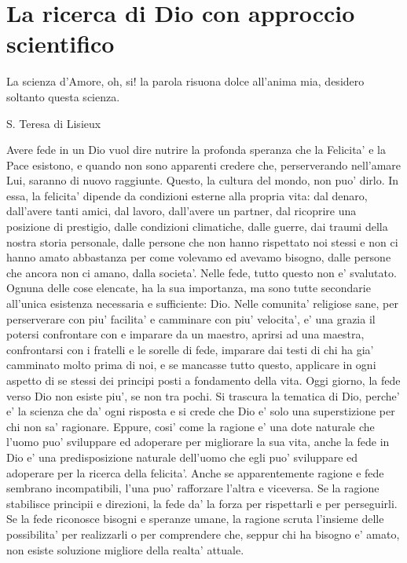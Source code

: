 \chapter{La ricerca di Dio con approccio scientifico}
\label{chapterDio}

\epigraph{
     La scienza d'Amore, oh, si! la parola risuona dolce all'anima mia, desidero soltanto questa scienza.
 }{S. Teresa di Lisieux}

Avere fede in un Dio vuol dire nutrire la profonda speranza che la Felicita' e la Pace esistono, e quando non sono apparenti credere che, perserverando nell'amare Lui, saranno di nuovo raggiunte. Questo, la cultura del mondo, non puo' dirlo. In essa, la felicita' dipende da condizioni esterne alla propria vita: dal denaro, dall'avere tanti amici, dal lavoro, dall'avere un partner, dal ricoprire una posizione di prestigio, dalle condizioni climatiche, dalle guerre, dai traumi della nostra storia personale, dalle persone che non hanno rispettato noi stessi e non ci hanno amato abbastanza per come volevamo ed avevamo bisogno, dalle persone che ancora non ci amano, dalla societa'. Nelle fede, tutto questo non e' svalutato. Ognuna delle cose elencate, ha la sua importanza, ma sono tutte secondarie all'unica esistenza necessaria e sufficiente: Dio.
Nelle comunita' religiose sane, per perserverare con piu' facilita' e camminare con piu' velocita', e' una grazia il potersi confrontare con e imparare da un maestro, aprirsi ad una maestra, confrontarsi con i fratelli e le sorelle di fede, imparare dai testi di chi ha gia' camminato molto prima di noi, e se mancasse tutto questo, applicare in ogni aspetto di se stessi dei principi posti a fondamento della vita.
Oggi giorno, la fede verso Dio non esiste piu', se non tra pochi. Si trascura la tematica di Dio, perche' e' la scienza che da' ogni risposta e si crede che Dio e' solo una superstizione per chi non sa' ragionare. Eppure, cosi' come la ragione e' una dote naturale che l'uomo puo' sviluppare ed adoperare per migliorare la sua vita, anche la fede in Dio e' una predisposizione naturale dell'uomo che egli puo' sviluppare ed adoperare per la ricerca della felicita'. Anche se apparentemente ragione e fede sembrano incompatibili, l'una puo' rafforzare l'altra e viceversa. Se la ragione stabilisce principii e direzioni, la fede da' la forza per rispettarli e per perseguirli. Se la fede riconosce bisogni e speranze umane, la ragione scruta l'insieme delle possibilita' per realizzarli o per comprendere che, seppur chi ha bisogno e' amato, non esiste soluzione migliore della realta' attuale.

